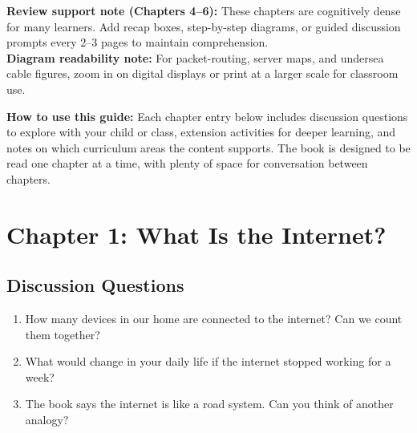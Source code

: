 

\begin{tcolorbox}[enhanced,colback=SunYellow!12,colframe=SunYellow!70!black,arc=6pt,boxrule=1pt,left=10pt,right=10pt,top=8pt,bottom=8pt]
\textbf{Review support note (Chapters 4--6):} These chapters are cognitively dense for many learners. Add recap boxes, step-by-step diagrams, or guided discussion prompts every 2--3 pages to maintain comprehension.\\
\textbf{Diagram readability note:} For packet-routing, server maps, and undersea cable figures, zoom in on digital displays or print at a larger scale for classroom use.
\end{tcolorbox}

\begin{tcolorbox}[enhanced,colback=LightGray,colframe=InternetBlue!50,arc=6pt,boxrule=1pt,
  left=10pt,right=10pt,top=10pt,bottom=10pt]
\textbf{How to use this guide:}
Each chapter entry below includes discussion questions to explore with your child or class,
extension activities for deeper learning, and notes on which curriculum areas the content supports.
The book is designed to be read one chapter at a time, with plenty of space for conversation between chapters.
\end{tcolorbox}

\vspace{12pt}

\section*{Chapter 1: What Is the Internet?}

\subsection*{Discussion Questions}
\begin{enumerate}
  \item How many devices in our home are connected to the internet? Can we count them together?
  \item What would change in your daily life if the internet stopped working for a week?
  \item The book says the internet is like a road system. Can you think of another analogy?
\end{enumerate}

